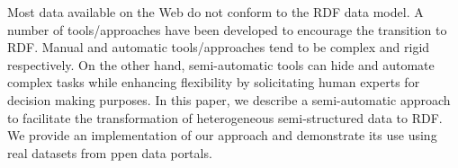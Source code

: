 Most data available on the Web do not conform to the RDF data model. A number of tools/approaches have been developed to encourage the transition to RDF. Manual and automatic tools/approaches tend to be complex and rigid respectively. On the other hand, semi-automatic tools can hide and automate complex tasks while enhancing flexibility by solicitating human experts for decision making purposes. In this paper, we describe a semi-automatic approach to facilitate the transformation of heterogeneous semi-structured data to RDF. We provide an implementation of our approach and demonstrate its use using real datasets from ppen data portals.




